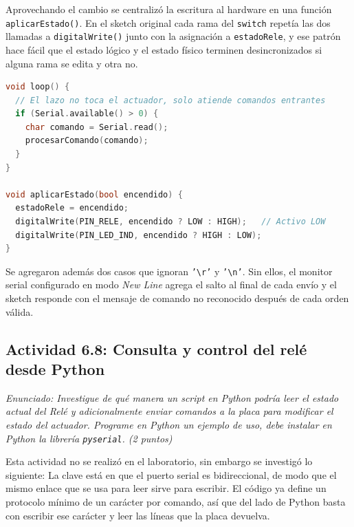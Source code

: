 Aprovechando el cambio se centralizó la escritura al hardware en una función
\texttt{aplicarEstado()}. En el sketch original cada rama del \texttt{switch} repetía las
dos llamadas a \texttt{digitalWrite()} junto con la asignación a \texttt{estadoRele}, y
ese patrón hace fácil que el estado lógico y el estado físico terminen desincronizados si
alguna rama se edita y otra no.

\begin{lstlisting}[language=C++,
    caption={Lazo principal y escritura centralizada, en \texttt{src/rele\_estado.ino}.},
    label={lst:rele_estado},
    float=ht!]
void loop() {
  // El lazo no toca el actuador, solo atiende comandos entrantes
  if (Serial.available() > 0) {
    char comando = Serial.read();
    procesarComando(comando);
  }
}

void aplicarEstado(bool encendido) {
  estadoRele = encendido;
  digitalWrite(PIN_RELE, encendido ? LOW : HIGH);   // Activo LOW
  digitalWrite(PIN_LED_IND, encendido ? HIGH : LOW);
}
\end{lstlisting}

Se agregaron además dos casos que ignoran \texttt{'\textbackslash r'} y
\texttt{'\textbackslash n'}. Sin ellos, el monitor serial configurado en modo
\textit{New Line} agrega el salto al final de cada envío y el sketch responde con el
mensaje de comando no reconocido después de cada orden válida.

\subsection{Actividad 6.8: Consulta y control del relé desde Python}
\textit{Enunciado: Investigue de qué manera un script en Python podría leer el estado
actual del Relé y adicionalmente enviar comandos a la placa para modificar el estado del
actuador. Programe en Python un ejemplo de uso, debe instalar en Python la librería
\texttt{pyserial}. (2 puntos)}

Esta actividad no se realizó en el laboratorio, sin embargo se investigó lo siguiente:
La clave está en que el puerto serial es bidireccional, de modo que el mismo enlace que se
usa para leer sirve para escribir. El código ya define un protocolo
mínimo de un carácter por comando, así que del lado de Python basta con escribir ese
carácter y leer las líneas que la placa devuelva.

\clearpage
